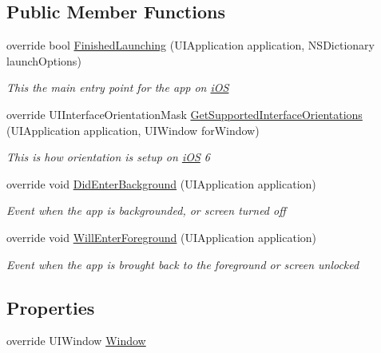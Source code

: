 \subsection*{Public Member Functions}
\begin{DoxyCompactItemize}
\item 
override bool \hyperlink{class_field_service_1_1i_o_s_1_1_app_delegate_a429640d0dc81848f5e65bc529e72caeb}{Finished\+Launching} (U\+I\+Application application, N\+S\+Dictionary launch\+Options)
\begin{DoxyCompactList}\small\item\em This the main entry point for the app on \hyperlink{namespace_field_service_1_1i_o_s}{i\+O\+S} \end{DoxyCompactList}\item 
override U\+I\+Interface\+Orientation\+Mask \hyperlink{class_field_service_1_1i_o_s_1_1_app_delegate_a8bbd0b9ae949c8ad8f3392be93f5c58a}{Get\+Supported\+Interface\+Orientations} (U\+I\+Application application, U\+I\+Window for\+Window)
\begin{DoxyCompactList}\small\item\em This is how orientation is setup on \hyperlink{namespace_field_service_1_1i_o_s}{i\+O\+S} 6 \end{DoxyCompactList}\item 
override void \hyperlink{class_field_service_1_1i_o_s_1_1_app_delegate_a70cd7cfe1d0d189481beb34655aa9203}{Did\+Enter\+Background} (U\+I\+Application application)
\begin{DoxyCompactList}\small\item\em Event when the app is backgrounded, or screen turned off \end{DoxyCompactList}\item 
override void \hyperlink{class_field_service_1_1i_o_s_1_1_app_delegate_a318f50c9f31b3177d2aa71503aa8f0fb}{Will\+Enter\+Foreground} (U\+I\+Application application)
\begin{DoxyCompactList}\small\item\em Event when the app is brought back to the foreground or screen unlocked \end{DoxyCompactList}\end{DoxyCompactItemize}
\subsection*{Properties}
\begin{DoxyCompactItemize}
\item 
override U\+I\+Window \hyperlink{class_field_service_1_1i_o_s_1_1_app_delegate_aad78e30996c7c8046d9a2335e66312af}{Window}
\end{DoxyCompactItemize}


